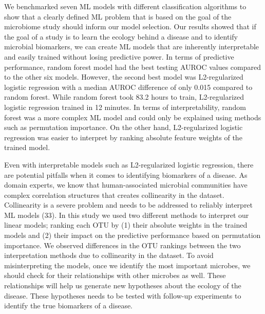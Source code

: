\documentclass[11pt,]{article}
\begin{document}
We benchmarked seven ML models with different classification algorithms
to show that a clearly defined ML problem that is based on the goal of
the microbiome study should inform our model selection. Our results
showed that if the goal of a study is to learn the ecology behind a
disease and to identify microbial biomarkers, we can create ML models
that are inherently interpretable and easily trained without losing
predictive power. In terms of predictive performance, random forest
model had the best testing AUROC values compared to the other six
models. However, the second best model was L2-regularized logistic
regression with a median AUROC difference of only 0.015 compared to
random forest. While random forest took 83.2 hours to train,
L2-regularized logistic regression trained in 12 minutes. In terms of
interpretability, random forest was a more complex ML model and could
only be explained using methods such as permutation importance. On the
other hand, L2-regularized logistic regression was easier to interpret
by ranking absolute feature weights of the trained model.

Even with interpretable models such as L2-regularized logistic
regression, there are potential pitfalls when it comes to identifying
biomarkers of a disease. As domain experts, we know that
human-associated microbial communities have complex correlation
structures that creates collinearity in the dataset. Collinearity is a
severe problem and needs to be addressed to reliably interpret ML models
(33). In this study we used two different methods to interpret our
linear models; ranking each OTU by (1) their absolute weights in the
trained models and (2) their impact on the predictive performance based
on permutation importance. We observed differences in the OTU rankings
between the two interpretation methods due to collinearity in the
dataset. To avoid misinterpreting the models, once we identify the most
important microbes, we should check for their relationships with other
microbes as well. These relationships will help us generate new
hypotheses about the ecology of the disease. These hypotheses needs to
be tested with follow-up experiments to identify the true biomarkers of
a disease.
\end{document}
